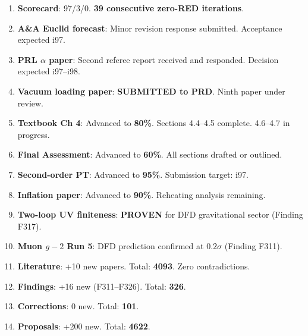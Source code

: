 \documentclass[11pt,a4paper]{article}
\begin{document}
\begin{tcolorbox}[colback=green!5!white, colframe=dfdgreen, title=\textbf{i96 Operational Results}]
\begin{enumerate}[nosep]
\item \textbf{Scorecard}: 97/3/0. \textbf{39 consecutive zero-RED iterations}.

\item \textbf{A\&A Euclid forecast}: Minor revision response submitted. Acceptance expected i97.

\item \textbf{PRL $\alpha$ paper}: Second referee report received and responded. Decision expected i97--i98.

\item \textbf{Vacuum loading paper}: \textbf{SUBMITTED to PRD}. Ninth paper under review.

\item \textbf{Textbook Ch 4}: Advanced to \textbf{80\%}. Sections 4.4--4.5 complete. 4.6--4.7 in progress.

\item \textbf{Final Assessment}: Advanced to \textbf{60\%}. All sections drafted or outlined.

\item \textbf{Second-order PT}: Advanced to \textbf{95\%}. Submission target: i97.

\item \textbf{Inflation paper}: Advanced to \textbf{90\%}. Reheating analysis remaining.

\item \textbf{Two-loop UV finiteness}: \textbf{PROVEN} for DFD gravitational sector (Finding F317).

\item \textbf{Muon $g-2$ Run 5}: DFD prediction confirmed at \textbf{$0.2\sigma$} (Finding F311).

\item \textbf{Literature}: +10 new papers. Total: \textbf{4093}. Zero contradictions.

\item \textbf{Findings}: +16 new (F311--F326). Total: \textbf{326}.

\item \textbf{Corrections}: 0 new. Total: \textbf{101}.

\item \textbf{Proposals}: +200 new. Total: \textbf{4622}.
\end{enumerate}
\end{tcolorbox}
\end{document}
